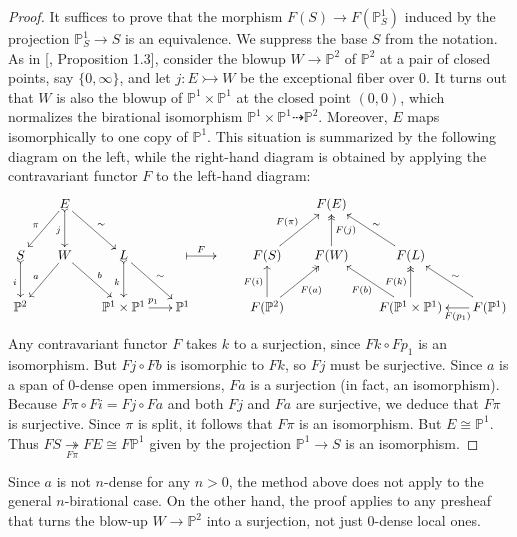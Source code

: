 \begin{proof}
It suffices to prove that the morphism $F(S)\to F(\mathbb{P}^1_S)$ induced by the projection $\mathbb{P}^1_S\to S$ is an equivalence. We suppress the base $S$ from the notation. As in [\cite{cisinski2023homotopy}, Proposition 1.3], consider the blowup $W\to \mathbb{P}^2$ of $\mathbb{P}^2$ at a pair of closed points, say $\{0,\infty\}$, and let $j:E\rightarrowtail W$ be the exceptional fiber over $0$. It turns out that $W$ is also the blowup of $\mathbb{P}^1\times \mathbb{P}^1$ at the closed point $(0,0)$, which normalizes the birational isomorphism $\mathbb{P}^1\times\mathbb{P}^1\dashrightarrow \mathbb{P}^2$. Moreover, $E$ maps isomorphically to one copy of $\mathbb{P}^1$. This situation is summarized by the following diagram on the left, while the right-hand diagram is obtained by applying the contravariant functor $F$ to the left-hand diagram:
\[
\xymatrix@C=1.75em{
  & E \ar[dl]_{\pi} \ar@{>->}[d]_{j} \ar[dr]^{\sim} & & & & & F(E) & & \\
  S \ar@{>->}[d]_i & W \ar[dl]_{a} \ar[dr]^{b} & L \ar@{>->}[d]_k \ar[dr]^{\sim} & \ar@{|->}[r]^F & & F(S) \ar[ur]^{F(\pi)} & F(W) \ar@{->>}[u]_{F(j)} & F(L) \ar[ul]_{\sim} & \\
  \mathbb{P}^2 & & \mathbb{P}^1 \times \mathbb{P}^1 \ar[r]^{p_1} & \mathbb{P}^1 & & F(\mathbb{P}^2) \ar[u]^{F(i)} \ar@{->>}[ur]_{F(a)} & & F(\mathbb{P}^1 \times \mathbb{P}^1) \ar[ul]^{F(b)} \ar@{->>}[u]^{F(k)} & F(\mathbb{P}^1) \ar[l]^-{F(p_1)} \ar[ul]_{\sim}
}
\]
Any contravariant functor $F$ takes $k$ to a surjection, since $Fk\circ Fp_1$ is an isomorphism. But $Fj\circ Fb$ is isomorphic to $Fk$, so $Fj$ must be surjective. Since $a$ is a span of $0$-dense open immersions, $Fa$ is a surjection (in fact, an isomorphism). Because $F\pi\circ Fi= Fj\circ Fa$ and both $Fj$ and $Fa$ are surjective, we deduce that $F\pi$ is surjective. Since $\pi$ is split, it follows that $F\pi$ is an isomorphism. But $E\cong \mathbb{P}^1$. Thus $FS\underset{F\pi}{\twoheadrightarrow}FE\cong F\mathbb{P}^1$ given by the projection $\mathbb{P}^1\to S$ is an isomorphism.
\end{proof}
\begin{rem}
    Since $a$ is not $n$-dense for any $n>0$, the method above does not apply to the general $n$-birational case. On the other hand, the proof applies to any presheaf that turns the blow-up $W\to \mathbb{P}^2$ into a surjection, not just $0$-dense local ones.
\end{rem}


